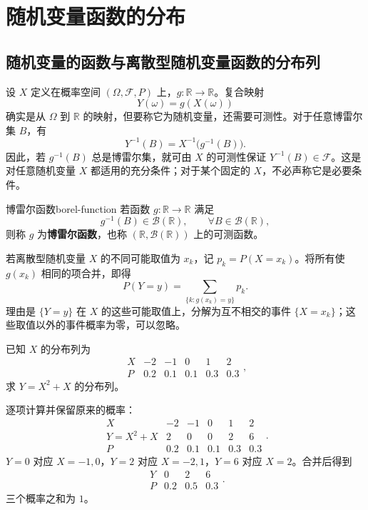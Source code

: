 \section{随机变量函数的分布}
\label{sec:distributions-of-functions}
\subsection*{随机变量的函数与离散型随机变量函数的分布列}

设 $X$ 定义在概率空间 $(\Omega,\mathcal F,P)$ 上，$g:\mathbb R\to\mathbb R$。复合映射
\[
Y(\omega)=g(X(\omega))
\]
确实是从 $\Omega$ 到 $\mathbb R$ 的映射，但要称它为随机变量，还需要可测性。对于任意博雷尔集 $B$，有
\[
Y^{-1}(B)=X^{-1}\bigl(g^{-1}(B)\bigr).
\]
因此，若 $g^{-1}(B)$ 总是博雷尔集，就可由 $X$ 的可测性保证 $Y^{-1}(B)\in\mathcal F$。这是对任意随机变量 $X$ 都适用的充分条件；对于某个固定的 $X$，不必声称它是必要条件。

\begin{mydefinition}{博雷尔函数}{borel-function}
若函数 $g:\mathbb R\to\mathbb R$ 满足
\[
g^{-1}(B)\in\mathcal B(\mathbb R),
\qquad \forall B\in\mathcal B(\mathbb R),
\]
则称 $g$ 为\textbf{博雷尔函数}，也称 $(\mathbb R,\mathcal B(\mathbb R))$ 上的可测函数。
\end{mydefinition}

若离散型随机变量 $X$ 的不同可能取值为 $x_k$，记 $p_k=P(X=x_k)$。将所有使 $g(x_k)$ 相同的项合并，即得
\[
P(Y=y)=\sum_{\{k:g(x_k)=y\}}p_k.
\]
理由是 $\{Y=y\}$ 在 $X$ 的这些可能取值上，分解为互不相交的事件 $\{X=x_k\}$；这些取值以外的事件概率为零，可以忽略。

\begin{example}[离散型随机变量的多项式变换]
已知 $X$ 的分布列为
\[
\begin{array}{c|ccccc}
X&-2&-1&0&1&2\\ \hline
P&0.2&0.1&0.1&0.3&0.3
\end{array},
\]
求 $Y=X^2+X$ 的分布列。

逐项计算并保留原来的概率：
\[
\begin{array}{c|ccccc}
X&-2&-1&0&1&2\\ \hline
Y=X^2+X&2&0&0&2&6\\
P&0.2&0.1&0.1&0.3&0.3
\end{array}.
\]
$Y=0$ 对应 $X=-1,0$，$Y=2$ 对应 $X=-2,1$，$Y=6$ 对应 $X=2$。合并后得到
\[
\begin{array}{c|ccc}
Y&0&2&6\\ \hline
P&0.2&0.5&0.3
\end{array}.
\]
三个概率之和为 $1$。
\end{example}

